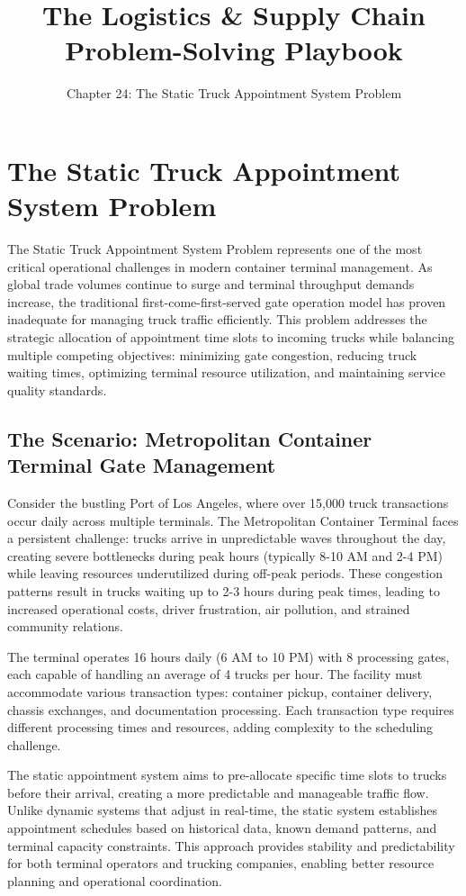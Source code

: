 \documentclass{article}
\title{The Logistics \& Supply Chain Problem-Solving Playbook}
\author{Chapter 24: The Static Truck Appointment System Problem}
\date{}
\begin{document}
\maketitle

\section{The Static Truck Appointment System Problem}

The Static Truck Appointment System Problem represents one of the most critical operational challenges in modern container terminal management. As global trade volumes continue to surge and terminal throughput demands increase, the traditional first-come-first-served gate operation model has proven inadequate for managing truck traffic efficiently. This problem addresses the strategic allocation of appointment time slots to incoming trucks while balancing multiple competing objectives: minimizing gate congestion, reducing truck waiting times, optimizing terminal resource utilization, and maintaining service quality standards.

\subsection{The Scenario: Metropolitan Container Terminal Gate Management}

Consider the bustling Port of Los Angeles, where over 15,000 truck transactions occur daily across multiple terminals. The Metropolitan Container Terminal faces a persistent challenge: trucks arrive in unpredictable waves throughout the day, creating severe bottlenecks during peak hours (typically 8-10 AM and 2-4 PM) while leaving resources underutilized during off-peak periods. These congestion patterns result in trucks waiting up to 2-3 hours during peak times, leading to increased operational costs, driver frustration, air pollution, and strained community relations.

The terminal operates 16 hours daily (6 AM to 10 PM) with 8 processing gates, each capable of handling an average of 4 trucks per hour. The facility must accommodate various transaction types: container pickup, container delivery, chassis exchanges, and documentation processing. Each transaction type requires different processing times and resources, adding complexity to the scheduling challenge.

The static appointment system aims to pre-allocate specific time slots to trucks before their arrival, creating a more predictable and manageable traffic flow. Unlike dynamic systems that adjust in real-time, the static system establishes appointment schedules based on historical data, known demand patterns, and terminal capacity constraints. This approach provides stability and predictability for both terminal operators and trucking companies, enabling better resource planning and operational coordination.
\end{document}
